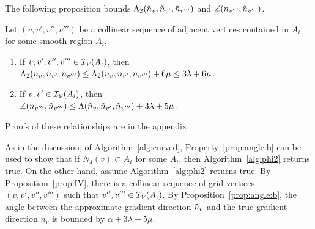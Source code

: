 The following proposition bounds $\Lambda_2(\tilde{n}_v,\tilde{n}_{v'},\tilde{n}_{v'''})$
and $\angle(n_{v'''},\tilde{n}_{v'''})$.
\begin{proposition}
Let $(v, v', v'',v''')$ be a collinear sequence of adjacent vertices
contained in $A_i$ for some smooth region $A_i$.
\begin{enumerate}
\item If $v, v', v'', v''' \in \mathcal{I_V}(A_i)$, then\\
{\centering
$\Lambda_2(\tilde{n}_v, \tilde{n}_{v'}, \tilde{n}_{v'''}) \le 
\Lambda_2(n_v, n_{v'}, n_{v'''}) + 6 \mu \le 3\lambda + 6 \mu$.}
\item If $v, v' \in \mathcal{I_V}(A_i)$, then\\
{\centering
$\angle(n_{v'''},\tilde{n}_{v'''}) 
   \le \Lambda(\tilde{n}_v,\tilde{n}_{v'},\tilde{n}_{v'''}) + 3\lambda+ 5 \mu$.}
\end{enumerate}
\label{prop:angle:b}
\end{proposition}
Proofs of these relationships are in the appendix.

As in the discussion, of Algorithm~\ref{alg:curved},
Property~\ref{prop:angle:b} can be used to show that 
if $N_4(v) \subset A_i$ for some $A_i$,
then Algorithm~\ref{alg:phi2} returns true.
On the other hand, assume Algorithm~\ref{alg:phi2} returns true.
By Proposition~\ref{prop:IV},
there is a collinear sequence of grid vertices $(v,v',v'',v''')$
such that $v'',v''' \in \mathcal{I_V}(A_i)$.
By Proposition~\ref{prop:angle:b},
the angle between the approximate gradient direction $\tilde{n}_v$
and the true gradient direction $n_v$ is bounded by $\alpha + 3\lambda + 5 \mu$.

%

